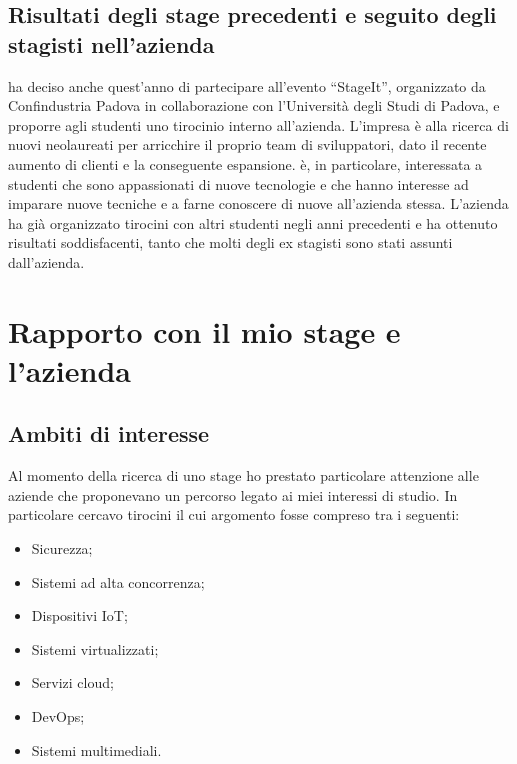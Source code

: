    \subsection{Risultati degli stage precedenti e seguito degli stagisti nell'azienda}
   \nomeAzienda{} ha deciso anche quest'anno di partecipare all'evento ``StageIt'', organizzato da Confindustria Padova in collaborazione con l'Università degli Studi di Padova, e proporre agli studenti uno tirocinio interno all'azienda. L'impresa è alla ricerca di nuovi neolaureati per arricchire il proprio team di sviluppatori, dato il recente aumento di clienti e la conseguente espansione. \nomeAzienda{} è, in particolare, interessata a studenti che sono appassionati di nuove tecnologie e che hanno interesse ad imparare nuove tecniche e a farne conoscere di nuove all'azienda stessa.
   L'azienda ha già organizzato tirocini con altri studenti negli anni precedenti e ha ottenuto risultati soddisfacenti, tanto che molti degli ex stagisti sono stati assunti dall'azienda.

\section{Rapporto con il mio stage e l'azienda}

   \subsection{Ambiti di interesse}
   Al momento della ricerca di uno stage ho prestato particolare attenzione alle aziende che proponevano un percorso legato ai miei interessi di studio. In particolare cercavo tirocini il cui argomento fosse compreso tra i seguenti:
   \begin{itemize}
      \item{Sicurezza;}
      \item{Sistemi ad alta concorrenza;}
      \item{Dispositivi IoT;}
      \item{Sistemi virtualizzati;}
      \item{Servizi cloud;}
      \item{DevOps;}
      \item{Sistemi multimediali.}
   \end{itemize}

